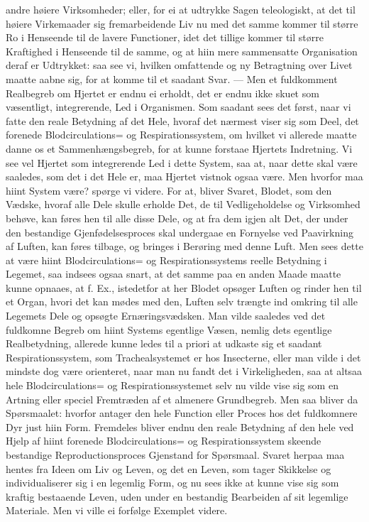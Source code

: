 \documentclass[12pt]{book}
\def\textit#1{#1}%
\newcommand{\opage}[1]{\marginnote{\footnotesize\textit{[#1]}}}
\begin{document}
andre høiere Virksomheder; eller, for ei at udtrykke Sagen teleologiskt, at det til høiere
Virkemaader sig fremarbeidende Liv nu med det samme kommer til større Ro i Henseende til
de lavere Functioner, idet det tillige kommer til større Kraftighed i Henseende til de
samme, og at hiin mere sammensatte Organisation deraf er Udtrykket: saa see vi, hvilken
omfattende og ny Betragtning over Livet maatte aabne sig, for at komme til et saadant
Svar. --- Men et fuldkomment Realbegreb om Hjertet er endnu ei erholdt, det er endnu ikke
skuet som væsentligt, integrerende, Led i Organismen. Som saadant sees det først, naar vi
fatte den reale Betydning af det Hele, hvoraf det nærmest viser sig som Deel, det forenede
Blodcirculations= og Respirationssystem, om hvilket vi allerede maatte danne os et
Sammenhængsbegreb, for at kunne forstaae Hjertets Indretning. Vi see vel Hjertet som
integrerende Led i dette System, saa at, naar dette skal være saaledes, som det i det Hele
er, maa Hjertet
\opage{131} vistnok ogsaa være. Men hvorfor maa hiint System være? spørge vi videre. For at, bliver
Svaret, Blodet, som den Vædske, hvoraf alle Dele skulle erholde Det, de til
Vedligeholdelse og Virksomhed behøve, kan føres hen til alle disse Dele, og at fra dem
igjen alt Det, der under den bestandige Gjenfødelsesproces skal undergaae en Fornyelse ved
Paavirkning af Luften, kan føres tilbage, og bringes i Berøring med denne Luft. Men sees
dette at være hiint Blodcirculations= og Respirationssystems reelle Betydning i Legemet,
saa indsees ogsaa snart, at det samme paa en anden Maade maatte kunne opnaaes, at f. Ex.,
istedetfor at her Blodet opsøger Luften og rinder hen til et Organ, hvori det kan mødes
med den, Luften selv trængte ind omkring til alle Legemets Dele og opsøgte
Ernæringsvædsken. Man vilde saaledes ved det fuldkomne Begreb om hiint Systems egentlige
Væsen, nemlig dets egentlige Realbetydning, allerede kunne ledes til \textit{a priori} at
udkaste sig et saadant Respirationssystem, som Trachealsystemet er hos Insecterne, eller
man vilde i det mindste dog være orienteret, naar man nu fandt det i Virkeligheden, saa at
altsaa hele Blodcirculations= og Respirationssystemet selv nu vilde vise sig som en
Artning eller speciel Fremtræden af et almenere Grundbegreb. Men saa bliver da
Spørsmaalet: hvorfor antager den hele Function eller Proces hos det fuldkomnere Dyr just
hiin Form. Fremdeles bliver endnu den reale
\opage{132} Betydning af den hele ved Hjelp af hiint forenede Blodcirculations= og
Respirationssystem skeende bestandige Reproductionsproces Gjenstand for Spørsmaal. Svaret
herpaa maa hentes fra Ideen om Liv og Leven, og det en Leven, som tager Skikkelse og
individualiserer sig i en legemlig Form, og nu sees ikke at kunne vise sig som kraftig
bestaaende Leven, uden under en bestandig Bearbeiden af sit legemlige Materiale. Men vi
ville ei forfølge Exemplet videre.
\end{document}
